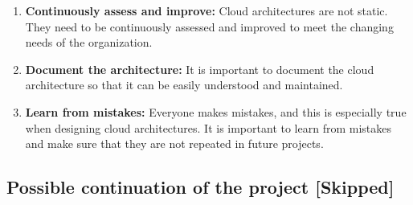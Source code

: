 \documentclass{article}
\begin{document}
\begin{enumerate}
    \item \textbf{Continuously assess and improve:} Cloud architectures are not static. They need to be continuously assessed and improved to meet the changing needs of the organization.

    \item \textbf{Document the architecture:} It is important to document the cloud architecture so that it can be easily understood and maintained.

    \item \textbf{Learn from mistakes:} Everyone makes mistakes, and this is especially true when designing cloud architectures. It is important to learn from mistakes and make sure that they are not repeated in future projects.
\end{enumerate}
\subsection{Possible continuation of the project \color{red}[Skipped]}
\newpage
\end{document}
